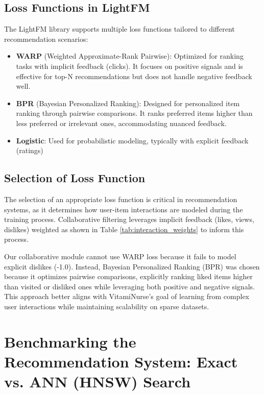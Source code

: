 \subsection{Loss Functions in LightFM}

The LightFM library supports multiple loss functions tailored to different recommendation scenarios:
\begin{itemize}
    \item \textbf{WARP} (Weighted Approximate-Rank Pairwise): Optimized for ranking tasks with implicit feedback (clicks). It focuses on positive signals and is effective for top-N recommendations but does not handle negative feedback well.
    \item \textbf{BPR} (Bayesian Personalized Ranking): Designed for personalized item ranking through pairwise comparisons. It ranks preferred items higher than less preferred or irrelevant ones, accommodating nuanced feedback.
    \item \textbf{Logistic}: Used for probabilistic modeling, typically with explicit feedback (ratings)
\end{itemize}

\subsection{Selection of Loss Function}

\par The selection of an appropriate loss function is critical in recommendation
systems, as it determines how user-item interactions are modeled during
the training process. Collaborative filtering leverages implicit feedback
(likes, views, dislikes) weighted as shown in Table \ref{tab:interaction_weights} to inform this
process.
\par Our collaborative module cannot use WARP loss because it fails to model
explicit dislikes (-1.0). Instead, Bayesian Personalized Ranking
(BPR) was chosen because it optimizes pairwise comparisons, explicitly
ranking liked items higher than visited or disliked ones while leveraging
both positive and negative signals. This approach better aligns with
VitamiNurse’s goal of learning from complex user interactions while
maintaining scalability on sparse datasets.

\vspace{0.5cm}
\section{Benchmarking the Recommendation System: Exact vs. ANN (HNSW) Search}

